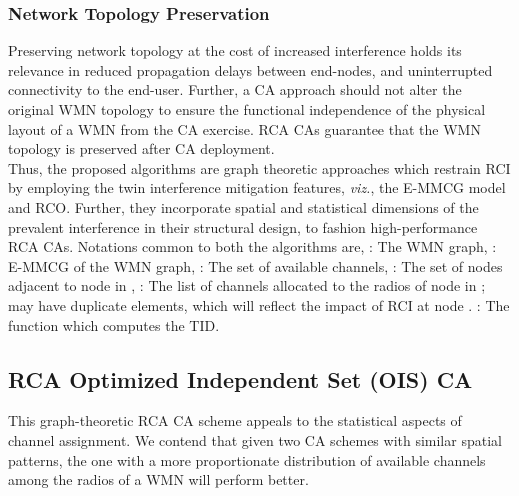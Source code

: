 \documentclass[conference]{IEEEtran}
\begin{document}
 \subsubsection{Network Topology Preservation} 
Preserving network topology at the cost of increased interference holds its relevance in reduced propagation delays between end-nodes, and uninterrupted connectivity to the end-user. Further, a CA approach should not alter the original WMN topology to ensure the functional independence of the physical layout of a WMN from the CA exercise. RCA CAs guarantee that the WMN topology is preserved after CA deployment. \\
Thus, the proposed algorithms are graph theoretic approaches which restrain RCI by employing the twin interference mitigation features, \emph{viz.}, the E-MMCG model and RCO. Further, they incorporate spatial and statistical dimensions of the prevalent interference in their structural design, to fashion high-performance RCA CAs. Notations common to both the algorithms are, : The WMN graph, : E-MMCG of the WMN graph,  : The set of  available channels,   : The set of nodes adjacent to node  in ,   : The list of channels allocated to the radios of node  in ;  may have duplicate elements, which will reflect the impact of RCI at node .  : The function which computes the TID.

\subsection{RCA Optimized Independent Set (OIS) CA}
This graph-theoretic RCA CA scheme appeals to the statistical aspects of channel assignment. We contend that given two CA schemes with similar spatial patterns, the one with a more proportionate distribution of available channels among the radios of a WMN will perform better. 
\end{document}
